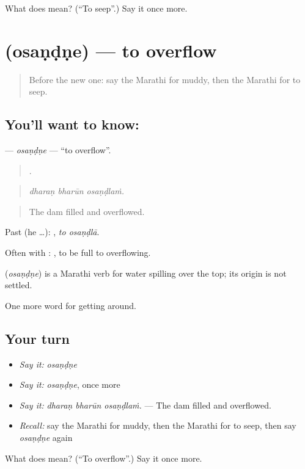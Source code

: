 \begin{tcolorbox}[breakable,colback=teal!4,colframe=teal!35!black,title={Before you move on}]
What does  mean? (\textquotedblleft{}To seep\textquotedblright{}.) Say it once more.
\end{tcolorbox}
\section[\texorpdfstring{\mr{ओसंडणे} (osaṇḍṇe)}{ओसंडणे (osaṇḍṇe)}]{ (osaṇḍṇe) — to overflow}

\label{lesson:MR-C444-osandne}



\begin{quote}
Before the new one: say the Marathi for muddy, then the Marathi for to seep.
\end{quote}

\subsection*{You'll want to know: }
\textbf{} — \emph{osaṇḍṇe} — \textquotedblleft{}to overflow\textquotedblright{}.

\begin{quote}
  .
\end{quote}

\begin{quote}
\emph{dharaṇ bharūn osaṇḍlaṁ.}
\end{quote}

\begin{quote}
The dam filled and overflowed.
\end{quote}

Past (he …):  , \emph{to osaṇḍlā}.

Often with :  , to be full to overflowing.

\begin{cousinweb}
\textbf{} (\emph{osaṇḍṇe}) is a Marathi verb for water spilling over the top; its origin is not settled.
\end{cousinweb}

\begin{grammarlens}[title={What you've built}]
One more word for getting around.
\end{grammarlens}

\subsection*{Your turn}
\begin{itemize}
\raggedright
  \item \emph{Say it:} \emph{osaṇḍṇe}
  \item \emph{Say it:} \emph{osaṇḍṇe}, once more
  \item \emph{Say it:} \emph{dharaṇ bharūn osaṇḍlaṁ.} — The dam filled and overflowed.
  \item \emph{Recall:} say the Marathi for muddy, then the Marathi for to seep, then say \emph{osaṇḍṇe} again
\end{itemize}

\begin{tcolorbox}[breakable,colback=teal!4,colframe=teal!35!black,title={Before you move on}]
What does  mean? (\textquotedblleft{}To overflow\textquotedblright{}.) Say it once more.
\end{tcolorbox}
